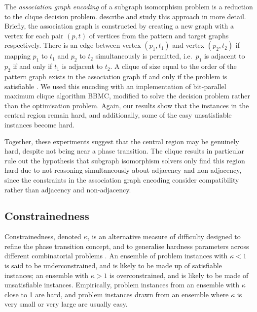 \documentclass[twoside,11pt]{article}
\begin{document}
The \emph{association graph encoding} of a subgraph isomorphism problem is a reduction to the clique
decision problem.  describe and study this approach in more
detail. Briefly, the association graph is constructed by creating a new graph with a vertex for each
pair $(p, t)$ of vertices from the pattern and target graphs respectively. There is an edge between
vertex $(p_1, t_1)$ and vertex $(p_2, t_2)$ if mapping $p_1$ to $t_1$ and $p_2$ to $t_2$
simultaneously is permitted, i.e.\ $p_1$ is adjacent to $p_2$ if and only if $t_1$ is adjacent to
$t_2$. A clique of size equal to the order of the pattern graph exists in the association graph if
and only if the problem is satisfiable \cite{o:Levi73}. We used this encoding with an
implementation of  bit-parallel maximum clique algorithm
BBMC, modified to solve the decision problem rather than the optimisation problem.  Again, our
results show that the instances in the central region remain hard, and additionally, some of the
easy unsatisfiable instances become hard.

Together, these experiments suggest that the central region may be genuinely hard, despite not being
near a phase transition. The clique results in particular rule out the hypothesis that subgraph
isomorphism solvers only find this region hard due to not reasoning simultaneously about adjacency
and non-adjacency, since the constraints in the association graph encoding consider compatibility
rather than adjacency and non-adjacency.

\subsection{Constrainedness}

Constrainedness, denoted $\kappa$, is an alternative measure of difficulty designed to refine the
phase transition concept, and to generalise hardness parameters across different combinatorial
problems \cite{DBLP:conf/aaai/GentMPW96}. An ensemble of problem instances with $\kappa < 1$ is
said to be underconstrained, and is likely to be made up of satisfiable instances; an ensemble with
$\kappa > 1$ is overconstrained, and is likely to be made of unsatisfiable instances. Empirically,
problem instances from an ensemble with $\kappa$ close to 1 are hard, and problem instances drawn
from an ensemble where $\kappa$ is very small or very large are usually easy.
\end{document}
